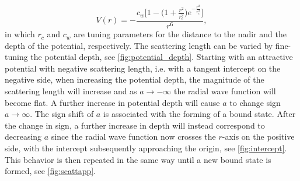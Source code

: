 \begin{equation}\label{modelpotential}
V(r) = -\frac{c_w\bigg[1-\Big(1 + \frac{r^2}{r_c^2}\Big)e^{-\frac{r^2}{r_c^2}}\bigg]}{r^6},
\end{equation}
in which $r_c$ and $c_w$ are tuning parameters for the distance to the nadir and the depth of the potential, respectively. The scattering length can be varied by fine-tuning the potential depth, see \cref{fig:potential_depth}. Starting with an attractive potential with negative scattering length, i.e. with a tangent intercept on the negative side, when increasing the potential depth, the magnitude of the scattering length will increase and as $a \rightarrow -\infty$ the radial wave function will become flat. A further increase in potential depth will cause $a$ to change sign $a \rightarrow \infty$. The sign shift of $a$ is associated with the forming of a bound state. After the change in sign, a further increase in depth will instead correspond to decreasing $a$ since the radial wave function now crosses the $r$-axis on the positive side, with the intercept subsequently approaching the origin, see \cref{fig:intercept}. This behavior is then repeated in the same way until a new bound state is formed, see \cref{fig:scattapp}.

